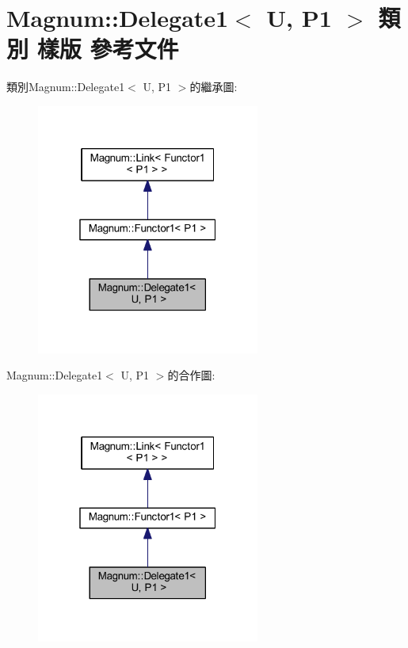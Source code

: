 \hypertarget{class_magnum_1_1_delegate1}{}\section{Magnum\+:\+:Delegate1$<$ U, P1 $>$ 類別 樣版 參考文件}
\label{class_magnum_1_1_delegate1}


類別\+Magnum\+:\+:Delegate1$<$ U, P1 $>$的繼承圖\+:\nopagebreak
\begin{figure}[H]
\begin{center}
\leavevmode
\includegraphics[width=208pt]{class_magnum_1_1_delegate1__inherit__graph}
\end{center}
\end{figure}


Magnum\+:\+:Delegate1$<$ U, P1 $>$的合作圖\+:\nopagebreak
\begin{figure}[H]
\begin{center}
\leavevmode
\includegraphics[width=208pt]{class_magnum_1_1_delegate1__coll__graph}
\end{center}
\end{figure}
